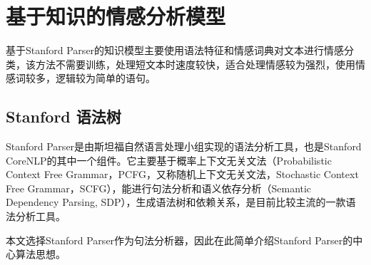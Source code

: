 \chapter{基于知识的情感分析模型}
基于Stanford Parser的知识模型主要使用语法特征和情感词典对文本进行情感分类，该方法不需要训练，处理短文本时速度较快，适合处理情感较为强烈，使用情感词较多，逻辑较为简单的语句。
\section{Stanford 语法树}
Stanford Parser是由斯坦福自然语言处理小组实现的语法分析工具，也是Stanford CoreNLP的其中一个组件。它主要基于概率上下文无关文法（Probabilistic Context Free Grammar，PCFG，又称随机上下文无关文法，Stochastic Context Free Grammar，SCFG），能进行句法分析和语义依存分析（Semantic Dependency Parsing, SDP），生成语法树和依赖关系，是目前比较主流的一款语法分析工具。\par
本文选择Stanford Parser作为句法分析器，因此在此简单介绍Stanford Parser的中心算法思想。\par

